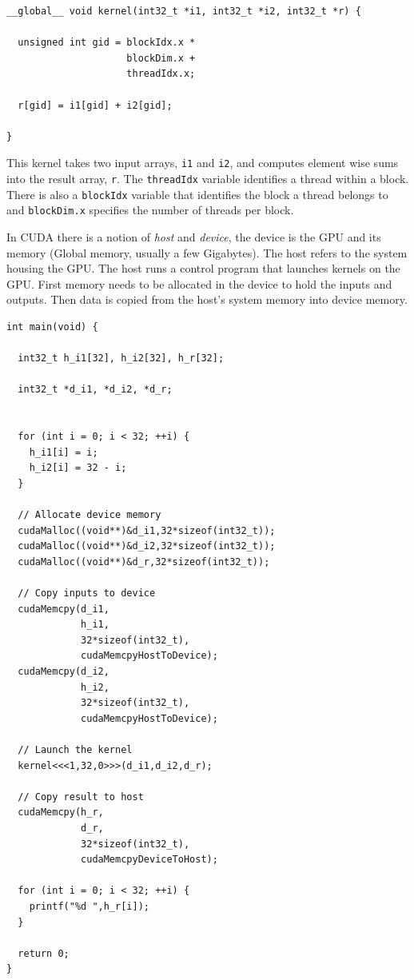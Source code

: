 \documentclass[a4paper]{book}
\begin{document}
\begin{small}
\begin{Verbatim}[samepage=true]
__global__ void kernel(int32_t *i1, int32_t *i2, int32_t *r) {
  
  unsigned int gid = blockIdx.x * 
                     blockDim.x + 
                     threadIdx.x;

  r[gid] = i1[gid] + i2[gid]; 

} 

\end{Verbatim}
\end{small}

This kernel takes two input arrays, {\tt i1} and {\tt i2}, and computes 
element wise sums into the result array, {\tt r}. The {\tt threadIdx} variable identifies 
a thread within a block. There is also a {\tt blockIdx} variable that identifies 
the block a thread belongs to and {\tt blockDim.x} specifies the number of threads per block. 


In CUDA there is a notion of {\em host} and {\em device}, the device is the GPU and 
its memory (Global memory, usually a few Gigabytes). The host refers to the system housing 
the GPU. The host runs a control program that launches kernels on the GPU. First memory 
needs to be allocated in the device to hold the inputs and outputs. Then data is copied from 
the host's system memory into device memory. 

\begin{small}
\begin{Verbatim}[samepage=true]
int main(void) {
  
  int32_t h_i1[32], h_i2[32], h_r[32]; 

  int32_t *d_i1, *d_i2, *d_r;

  
  for (int i = 0; i < 32; ++i) { 
    h_i1[i] = i;
    h_i2[i] = 32 - i;
  }

  // Allocate device memory
  cudaMalloc((void**)&d_i1,32*sizeof(int32_t));
  cudaMalloc((void**)&d_i2,32*sizeof(int32_t));
  cudaMalloc((void**)&d_r,32*sizeof(int32_t));
  
  // Copy inputs to device
  cudaMemcpy(d_i1,
             h_i1,
             32*sizeof(int32_t),
             cudaMemcpyHostToDevice);
  cudaMemcpy(d_i2,
             h_i2,
             32*sizeof(int32_t),
             cudaMemcpyHostToDevice);
  
  // Launch the kernel
  kernel<<<1,32,0>>>(d_i1,d_i2,d_r); 

  // Copy result to host
  cudaMemcpy(h_r,
             d_r,
             32*sizeof(int32_t),
             cudaMemcpyDeviceToHost);

  for (int i = 0; i < 32; ++i) { 
    printf("%d ",h_r[i]);
  }

  return 0;
}
\end{Verbatim} 
\end{small}
\end{document}
